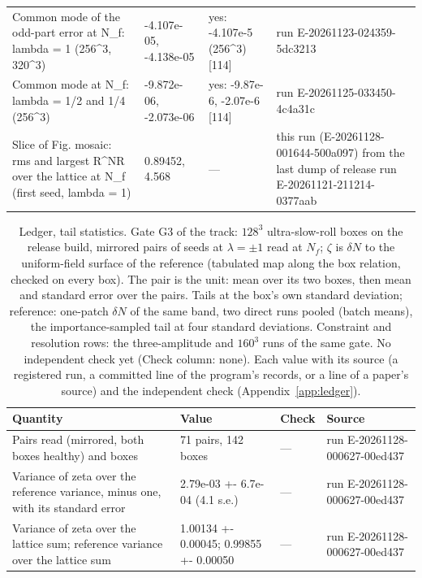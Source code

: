 \begin{table}
\begin{tabular}{p{}p{}p{}p{}}
Common mode of the odd-part error at N\_f: lambda = 1 (256\^{}3, 320\^{}3) & -4.107e-05, -4.138e-05 & yes: -4.107e-5 (256\^{}3) [114] & run E-20261123-024359-5dc3213 \\
Common mode at N\_f: lambda = 1/\allowbreak{}2 and 1/\allowbreak{}4 (256\^{}3) & -9.872e-06, -2.073e-06 & yes: -9.87e-6, -2.07e-6 [114] & run E-20261125-033450-4c4a31c \\
Slice of Fig. mosaic: rms and largest R\^{}NR over the lattice at N\_f (first seed, lambda = 1) & 0.89452, 4.568 & --- & this run (E-20261128-001644-500a097) from the last dump of release run E-20261121-211214-0377aab \\
\bottomrule
\end{tabular}
\end{table}

\begin{table}
\caption{Ledger, tail statistics. Gate G3 of the track: $128^3$ ultra-slow-roll boxes on the release build, mirrored pairs of seeds at $\lambda = \pm1$ read at $N_f$; $\zeta$ is $\delta N$ to the uniform-field surface of the reference (tabulated map along the box relation, checked on every box). The pair is the unit: mean over its two boxes, then mean and standard error over the pairs. Tails at the box's own standard deviation; reference: one-patch $\delta N$ of the same band, two direct runs pooled (batch means), the importance-sampled tail at four standard deviations. Constraint and resolution rows: the three-amplitude and $160^3$ runs of the same gate. No independent check yet (Check column: none). Each value with its source (a registered run, a committed line of the program's records, or a line of a paper's source) and the independent check (Appendix~\ref{app:ledger}).}
\label{tab:ledgertailstatistics}
\footnotesize
\begin{tabular}{p{}p{}p{}p{}}
\toprule
Quantity & Value & Check & Source \\
\midrule
Pairs read (mirrored, both boxes healthy) and boxes & 71 pairs, 142 boxes & --- & run E-20261128-000627-00ed437 \\
Variance of zeta over the reference variance, minus one, with its standard error & 2.79e-03 +- 6.7e-04 (4.1 s.e.) & --- & run E-20261128-000627-00ed437 \\
Variance of zeta over the lattice sum; reference variance over the lattice sum & 1.00134 +- 0.00045; 0.99855 +- 0.00050 & --- & run E-20261128-000627-00ed437 \\

\end{tabular}
\end{table}
